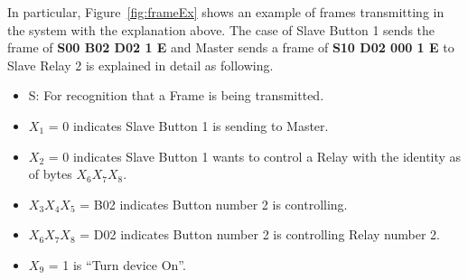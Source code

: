     In particular, Figure~\ref{fig:frameEx} shows an example of frames transmitting in the system with the explanation above. The case of Slave Button 1 sends the frame of \textbf{S00 B02 D02 1 E} and Master sends a frame of \textbf{S10 D02 000 1 E} to Slave Relay 2 is explained in detail as following.
    \begin{itemize}
        \item S: For recognition that a Frame is being transmitted.
        \item $X_1$ = 0 indicates Slave Button 1 is sending to Master.
        \item $X_2$ = 0 indicates Slave Button 1 wants to control a Relay with the identity as of bytes $X_6$$X_7$$X_8$.
        \item $X_3$$X_4$$X_5$ = B02 indicates Button number 2 is controlling.
        \item $X_6$$X_7$$X_8$ = D02 indicates Button number 2 is controlling Relay number 2.
        \item $X_9$ = 1 is “Turn device On”.
    \end{itemize}

